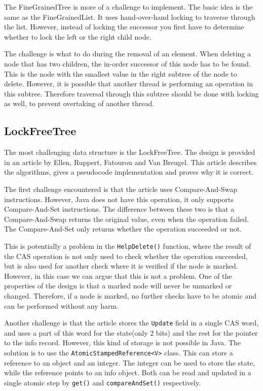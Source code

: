 \documentclass[a4paper]{article}
\begin{document}
The FineGrainedTree is more of a challenge to implement. The basic idea is the same as the
FineGrainedList. It uses hand-over-hand locking to traverse through the list. However,
instead of locking the successor you first have to determine whether to lock the left or
the right child node.

The challenge is what to do during the removal of an element. When deleting a node that
has two children, the in-order successor of this node has to be found. This is the node
with the smallest value in the right subtree of the node to delete. However, it is 
possible that another thread is performing an operation in this subtree. Therefore 
traversal through this subtree should be done with locking as well, to prevent overtaking
of another thread.

\subsection{LockFreeTree}

The most challenging data structure is the LockFreeTree. The design is provided in an 
article by Ellen, Ruppert, Fatourou and Van Breugel.\cite{lft} This article describes the
algorithms, gives a pseudocode implementation and proves why it is correct.

The first challenge encountered is that the article uses Compare-And-Swap instructions.
However, Java does not have this operation, it only supports Compare-And-Set instructions.
The difference between these two is that a Compare-And-Swap returns the original value,
even when the operation failed. The Compare-And-Set only returns whether the operation 
succeeded or not.

This is potentially a problem in the \texttt{HelpDelete()} function, where the result of
the CAS operation is not only used to check whether the operation succeeded, but is also
used for another check where it is verified if the node is marked. However, in this
case we can argue that this is not a problem. One of the properties of the design is that
a marked node will never be unmarked or changed. Therefore, if a node is marked, no 
further checks have to be atomic and can be performed without any harm.

Another challenge is that the article stores the \texttt{Update} field in a single CAS
word, and uses a part of this word for the state(only 2 bits) and the rest for the pointer
to the info record. However, this kind of storage is not possible in Java. The solution is
to use the \texttt{AtomicStampedReference<V>} class. This can store a reference to an
object and an integer. The integer can be used to store the state, while the reference 
points to an info object. Both can be read and updated in a single atomic step by
\texttt{get()} and \texttt{compareAndSet()} respectively.
\end{document}
